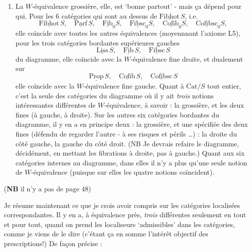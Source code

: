 \documentclass[11pt]{article}
\newcommand{\printedpage}[1]{\marginpar{\footnotesize p.~#1}}
\newcommand{\msp}[1]{\marginpar{\footnotesize [#1]}}
\newcommand{\Cat}{\mathrm{Cat}}
\newcommand{\uc}[1]{\underline{\mathrm{#1}}}
\begin{document}
\begin{enumerate}[leftmargin=*]
\item[3)] La $W$-équivalence grossière, elle, est `bonne partout' - mais ça dépend pour qui. Pour les 6 catégories qui sont au dessus de $\uc{Fibhot}\,S$, i.e.
\[
\uc{Fibhot}\,S,\quad \uc{Parf}\,S,\quad \uc{Fib}_0S,\quad \uc{Fibsc}_0S,\quad \uc{Cofib}_0S,\quad \uc{Cofibsc}_0S,
\]
\printedpage{30}
elle coïncide avec toutes les autres équivalences (moyennnant l'axiome L5), pour les trois catégories bordantes supérieures gauches %
\[
\uc{Liss}\,S,\quad \uc{Fib}\,S,\quad \uc{Fibsc}\,S
\]
du diagramme, elle coïncide avec la $W$-équivalence fine droite, et dualement sur
\[
\uc{Prop}\,S,\quad \uc{Cofib}\,S,\quad \uc{Cofibsc}\,S
\]
elle coïncide avec la $W$-équivalence fine gauche. Quant à $\Cat/S$ tout entier, c'est la seule des catégories du diagramme où il y ait \textit{trois} notions intéressantes différentes de $W$-équivalence, à savoir : la grossière, et les deux fines (à gauche, à droite). Sur les autres six catégories bordantes du diagramme, il y en a en principe deux : la grossière, et une spécifiée des deux fines (défendu de regarder l'autre - à ses risques et périls \ldots) : la droite du côté gauche, la gauche du côté droit. (NB Je devrais refaire le diagramme, décidément, en mettant les fibrations à droite, pas à gauche.) Quant aux six catégories internes au diagramme, dans elles il n'y a plus qu'une seule notion de $W$-équivalence (puisque sur elles les quatre notions coïncident).
\end{enumerate}

\msp{page 48: blank}

\msp{page 49} (\textbf{NB} il n'y a pas de page 48)

Je résume maintenant ce que je crois avoir compris sur les catégories localisées correspondantes. Il y en a, à équivalence près, \textit{trois} différentes seulement en tout et pour tout, quand on prend les localiseurs `admissibles' dans les catégories, comme je viens de le dire (c'étant ça en somme l'intérêt objectif des prescriptions!) De façon précise :
\end{document}
